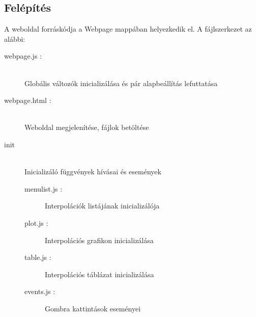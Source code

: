 \documentclass{elteikthesis}
\begin{document}
\subsection{Felépítés}
	A weboldal forráskódja a Webpage mappában helyezkedik el. 
	A fájlszerkezet az alábbi:
	\begin{description}
		\item[webpage.js :] \hfill \\  Globális változók inicializálása és pár alapbeállítás lefuttatása
		\item[webpage.html :]  \hfill \\ Weboldal megjelenítése, fájlok betöltése
		\item[init] 
		\hfill \\ Inicializáló függvények hívásai és események
		\begin{description}
			\item[menulist.js : ] Interpolációk listájának inicializálója
		  	\item[plot.js : ] Interpolációs grafikon inicializálása
			\item[table.js : ] Interpolációs táblázat inicializálása
		 	\item[events.js : ] Gombra kattintások eseményei
		\end{description}


\end{description}
\end{document}
